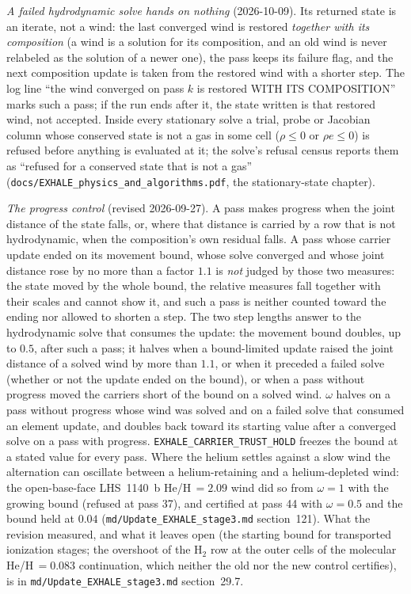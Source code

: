 \documentclass[english,a4paper]{my_memo}
\begin{document}
\emph{A failed hydrodynamic solve hands on nothing} (2026-10-09). Its returned
state is an iterate, not a wind: the last converged wind is restored
\emph{together with its composition} (a wind is a solution for its
composition, and an old wind is never relabeled as the solution of a newer
one), the pass keeps its failure flag, and the next composition update is
taken from the restored wind with a shorter step. The log line ``the wind
converged on pass $k$ is restored WITH ITS COMPOSITION'' marks such a pass;
if the run ends after it, the state written is that restored wind, not
accepted. Inside every stationary solve a trial, probe or Jacobian column
whose conserved state is not a gas in some cell ($\rho\le0$ or $\rho e\le0$)
is refused before anything is evaluated at it; the solve's refusal census
reports them as ``refused for a conserved state that is not a gas''
(\texttt{docs/EXHALE\_physics\_and\_algorithms.pdf}, the stationary-state
chapter).

\emph{The progress control} (revised 2026-09-27). A pass makes progress when
the joint distance of the state falls, or, where that distance is carried by
a row that is not hydrodynamic, when the composition's own residual falls. A
pass whose carrier update ended on its movement bound, whose solve converged
and whose joint distance rose by no more than a factor $1.1$ is \emph{not}
judged by those two measures: the state moved by the whole bound, the
relative measures fall together with their scales and cannot show it, and
such a pass is neither counted toward the ending nor allowed to shorten a
step. The two step lengths answer to the hydrodynamic solve that consumes the
update: the movement bound doubles, up to $0.5$, after such a pass; it halves
when a bound-limited update raised the joint distance of a solved wind by more
than $1.1$, or when it preceded a failed solve (whether or not the update
ended on the bound), or when a pass without progress moved the carriers short
of the bound on a solved wind. $\omega$ halves on a pass without progress
whose wind was solved and on a failed solve that consumed an element update,
and doubles back toward its starting value after a converged solve on a pass
with progress.
\texttt{EXHALE\_CARRIER\_TRUST\_HOLD} freezes the bound at a stated value for
every pass. Where the helium settles against a slow wind the alternation can
oscillate between a helium-retaining and a helium-depleted wind: the
open-base-face LHS~1140~b He/H\,$=2.09$ wind did so from $\omega=1$ with the
growing bound (refused at pass 37), and certified at pass 44 with $\omega=0.5$
and the bound held at $0.04$ (\texttt{md/Update\_EXHALE\_stage3.md}
section~121). What the revision measured, and what it leaves open (the starting
bound for transported ionization stages; the overshoot of the H$_2$ row at the
outer cells of the molecular He/H\,$=0.083$ continuation, which neither the
old nor the new control certifies), is in \texttt{md/Update\_EXHALE\_stage3.md}
section~29.7.
\end{document}
